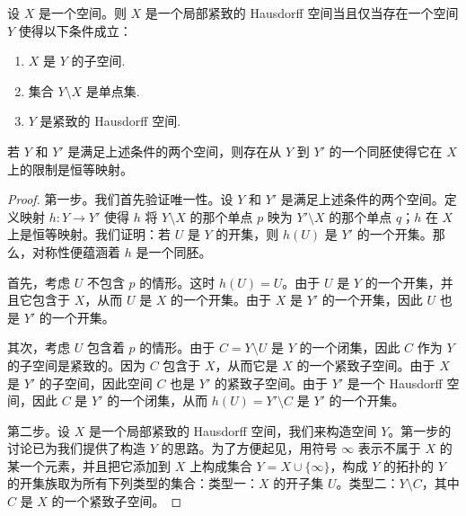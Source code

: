 \begin{theorem}\label{theorem:ch03-one-point-compactification}
设 $X$ 是一个空间。则 $X$ 是一个局部紧致的 Hausdorff 空间当且仅当存在一个空间 $Y$ 使得以下条件成立：
\begin{enumerate}
\item $X$ 是 $Y$ 的子空间.
\item 集合 $Y\setminus X$ 是单点集.
\item $Y$ 是紧致的 Hausdorff 空间.
\end{enumerate}
若 $Y$ 和 $Y'$ 是满足上述条件的两个空间，则存在从 $Y$ 到 $Y'$ 的一个同胚使得它在 $X$ 上的限制是恒等映射。
\end{theorem}

\begin{proof}
第一步。我们首先验证唯一性。设 $Y$ 和 $Y'$ 是满足上述条件的两个空间。定义映射 $h\colon Y\to Y'$ 使得 $h$ 将 $Y\setminus X$ 的那个单点 $p$ 映为 $Y'\setminus X$ 的那个单点 $q$；$h$ 在 $X$ 上是恒等映射。我们证明：若 $U$ 是 $Y$ 的开集，则 $h(U)$ 是 $Y'$ 的一个开集。那么，对称性便蕴涵着 $h$ 是一个同胚。

首先，考虑 $U$ 不包含 $p$ 的情形。这时 $h(U)=U$。由于 $U$ 是 $Y$ 的一个开集，并且它包含于 $X$，从而 $U$ 是 $X$ 的一个开集。由于 $X$ 是 $Y'$ 的一个开集，因此 $U$ 也是 $Y'$ 的一个开集。

其次，考虑 $U$ 包含着 $p$ 的情形。由于 $C=Y\setminus U$ 是 $Y$ 的一个闭集，因此 $C$ 作为 $Y$ 的子空间是紧致的。因为 $C$ 包含于 $X$，从而它是 $X$ 的一个紧致子空间。由于 $X$ 是 $Y'$ 的子空间，因此空间 $C$ 也是 $Y'$ 的紧致子空间。由于 $Y'$ 是一个 Hausdorff 空间，因此 $C$ 是 $Y'$ 的一个闭集，从而 $h(U)=Y'\setminus C$ 是 $Y'$ 的一个开集。

第二步。设 $X$ 是一个局部紧致的 Hausdorff 空间，我们来构造空间 $Y$。第一步的讨论已为我们提供了构造 $Y$ 的思路。为了方便起见，用符号 $\infty$ 表示不属于 $X$ 的某一个元素，并且把它添加到 $X$ 上构成集合 $Y=X\cup\{\infty\}$，构成 $Y$ 的拓扑的 $Y$ 的开集族取为所有下列类型的集合：类型一：$X$ 的开子集 $U$。类型二：$Y\setminus C$，其中 $C$ 是 $X$ 的一个紧致子空间。


\end{proof}

